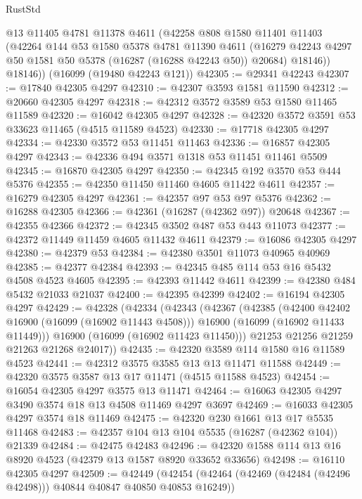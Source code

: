 \begin{lexlean}{RustStd}
\begin{coremodule}
        @13
        @11405
        @4781
        @11378
        @4611
        (@42258
          @808
          @1580
          @11401
          @11403
          (@42264
            @144
            @53
            @1580
            @5378
            @4781
            @11390
            @4611
            (@16279 @42243 @4297 @50 @1581 @50 @5378 (@16287 (@16288 @42243 @50)) @20684)
            @18146))
        @18146))
    (@16099 (@19480 @42243 @121))
@42305 := @29341 @42243
@42307 := @17840 @42305 @4297
@42310 := @42307 @3593 @1581 @11590
@42312 := @20660 @42305 @4297
@42318 := @42312 @3572 @3589 @53 @1580 @11465 @11589
@42320 := @16042 @42305 @4297
@42328 := @42320 @3572 @3591 @53 @33623 @11465 (@4515 @11589 @4523)
@42330 := @17718 @42305 @4297
@42334 := @42330 @3572 @53 @11451 @11463
@42336 := @16857 @42305 @4297
@42343 := @42336 @494 @3571 @1318 @53 @11451 @11461 @5509
@42345 := @16870 @42305 @4297
@42350 := @42345 @192 @3570 @53 @444 @5376
@42355 := @42350 @11450 @11460 @4605 @11422 @4611
@42357 := @16279 @42305 @4297
@42361 := @42357 @97 @53 @97 @5376
@42362 := @16288 @42305
@42366 := @42361 (@16287 (@42362 @97)) @20648
@42367 := @42355 @42366
@42372 := @42345 @3502 @487 @53 @443 @11073
@42377 := @42372 @11449 @11459 @4605 @11432 @4611
@42379 := @16086 @42305 @4297
@42380 := @42379 @53
@42384 := @42380 @3501 @11073 @40965 @40969
@42385 := @42377 @42384
@42393 := @42345 @485 @114 @53 @16 @5432 @4508 @4523 @4605
@42395 := @42393 @11442 @4611
@42399 := @42380 @484 @5432 @21033 @21037
@42400 := @42395 @42399
@42402 := @16194 @42305 @4297
@42429 := @42328
    (@42334
      (@42343
        (@42367
          (@42385
            (@42400 @42402 @16900 (@16099 (@16902 @11443 @4508)))
            @16900
            (@16099 (@16902 @11433 @11449)))
          @16900
          (@16099 (@16902 @11423 @11450)))
        @21253
        @21256
        @21259
        @21263
        @21268
        @24017))
@42435 := @42320 @3589 @114 @1580 @16 @11589 @4523
@42441 := @42312 @3575 @3585 @13 @13 @11471 @11588
@42449 := @42320 @3575 @3587 @13 @17 @11471 (@4515 @11588 @4523)
@42454 := @16054 @42305 @4297 @3575 @13 @11471
@42464 := @16063 @42305 @4297 @3490 @3574 @18 @13 @4508 @11469 @4297 @3697
@42469 := @16033 @42305 @4297 @3574 @18 @11469
@42475 := @42320 @230 @1661 @13 @17 @5535 @11468
@42483 := @42357 @104 @13 @104 @5535 (@16287 (@42362 @104)) @21339
@42484 := @42475 @42483
@42496 := @42320 @1588 @114 @13 @16 @8920 @4523 (@42379 @13 @1587 @8920 @33652 @33656)
@42498 := @16110 @42305 @4297
@42509 := @42449
    (@42454 (@42464 (@42469 (@42484 (@42496 @42498))) @40844 @40847 @40850 @40853 @16249))

\end{coremodule}
\end{lexlean}
